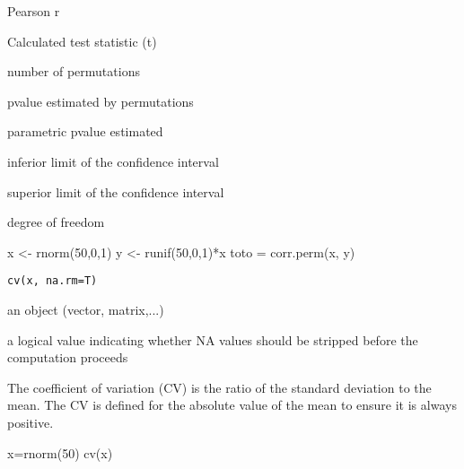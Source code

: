 \documentclass[a4paper]{book}
\begin{document}
%
\begin{Value}
\begin{ldescription}
\item[\code{Correlation }] Pearson r
\item[\code{t.stat }] Calculated test statistic (t)
\item[\code{No.perm }] number of permutations
\item[\code{P.perm }] pvalue estimated by permutations
\item[\code{P.para }] parametric pvalue estimated
\item[\code{inf }] inferior limit of the confidence interval
\item[\code{sup }] superior limit of the confidence interval
\item[\code{df }] degree of freedom
\end{ldescription}
\end{Value}
%
\begin{Examples}
\begin{ExampleCode}
x <- rnorm(50,0,1)
y <- runif(50,0,1)*x
toto = corr.perm(x, y)
\end{ExampleCode}
\end{Examples}
\newpage
{}
%
\begin{Usage}
\begin{verbatim}
cv(x, na.rm=T)
\end{verbatim}
\end{Usage}
%
\begin{Arguments}
\begin{ldescription}
\item[\code{x}] an \R{} object (vector, matrix,...)

\item[\code{na.rm}] a logical value indicating whether NA values should be stripped before the computation proceeds

\end{ldescription}
\end{Arguments}
%
\begin{Details}\relax
The coefficient of variation (CV) is the ratio of the standard deviation to the mean.
The CV is defined for the absolute value of the mean to ensure it is always positive. 
\end{Details}
%
\begin{Examples}
\begin{ExampleCode}
x=rnorm(50)
cv(x)
\end{ExampleCode}
\end{Examples}
\end{document}
